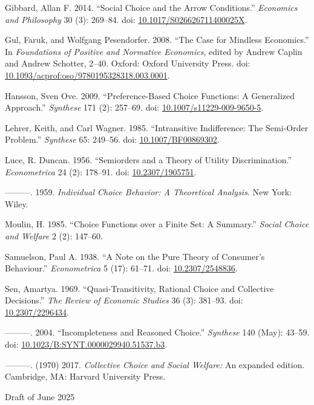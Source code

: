 \documentclass[
  11pt,
  letterpaper,
  DIV=11,
  numbers=noendperiod,
  twoside]{scrartcl}
\newlength{\cslhangindent}
\newenvironment{CSLReferences}[2] %
 {\begin{list}{}{%
  \setlength{\itemindent}{0pt}
  \setlength{\leftmargin}{0pt}
  \setlength{\parsep}{0pt}
  \ifodd #1
   \setlength{\leftmargin}{\cslhangindent}
   \setlength{\itemindent}{-1\cslhangindent}
  \fi
  \setlength{\itemsep}{#2\baselineskip}}}
 {\end{list}}
\begin{document}
\begin{CSLReferences}{1}{0}
Gibbard, Allan F. 2014. {``Social Choice and the Arrow Conditions.''}
\emph{Economics and Philosophy} 30 (3): 269--84. doi:
\href{https://doi.org/10.1017/S026626711400025X}{10.1017/S026626711400025X}.

Gul, Faruk, and Wolfgang Pesendorfer. 2008. {``The Case for Mindless
Economics.''} In \emph{Foundations of Positive and Normative Economics},
edited by Andrew Caplin and Andrew Schotter, 2--40. Oxford: Oxford
University Press. doi:
\href{https://doi.org/10.1093/acprof:oso/9780195328318.003.0001}{10.1093/acprof:oso/9780195328318.003.0001}.

Hansson, Sven Ove. 2009. {``Preference-Based Choice Functions: A
Generalized Approach.''} \emph{Synthese} 171 (2): 257--69. doi:
\href{https://doi.org/10.1007/s11229-009-9650-5}{10.1007/s11229-009-9650-5}.

Lehrer, Keith, and Carl Wagner. 1985. {``Intransitive Indifference: The
Semi-Order Problem.''} \emph{Synthese} 65: 249--56. doi:
\href{https://doi.org/10.1007/BF00869302}{10.1007/BF00869302}.

Luce, R. Duncan. 1956. {``Semiorders and a Theory of Utility
Discrimination.''} \emph{Econometrica} 24 (2): 178--91. doi:
\href{https://doi.org/10.2307/1905751}{10.2307/1905751}.

---------. 1959. \emph{Individual Choice Behavior: A Theoretical
Analysis}. New York: Wiley.

Moulin, H. 1985. {``Choice Functions over a Finite Set: A Summary.''}
\emph{Social Choice and Welfare} 2 (2): 147--60.

Samuelson, Paul A. 1938. {``A Note on the Pure Theory of Consumer's
Behaviour.''} \emph{Econometrica} 5 (17): 61--71. doi:
\href{https://doi.org/10.2307/2548836}{10.2307/2548836}.

Sen, Amartya. 1969. {``Quasi-Transitivity, Rational Choice and
Collective Decisions.''} \emph{The Review of Economic Studies} 36 (3):
381--93. doi: \href{https://doi.org/10.2307/2296434}{10.2307/2296434}.

---------. 2004. {``Incompleteness and Reasoned Choice.''}
\emph{Synthese} 140 (May): 43--59. doi:
\href{https://doi.org/10.1023/B:SYNT.0000029940.51537.b3}{10.1023/B:SYNT.0000029940.51537.b3}.

---------. (1970) 2017. \emph{Collective Choice and Social Welfare:} An
expanded edition. Cambridge, MA: Harvard University Press.

\end{CSLReferences}



\noindent Draft of June 2025
\end{document}
